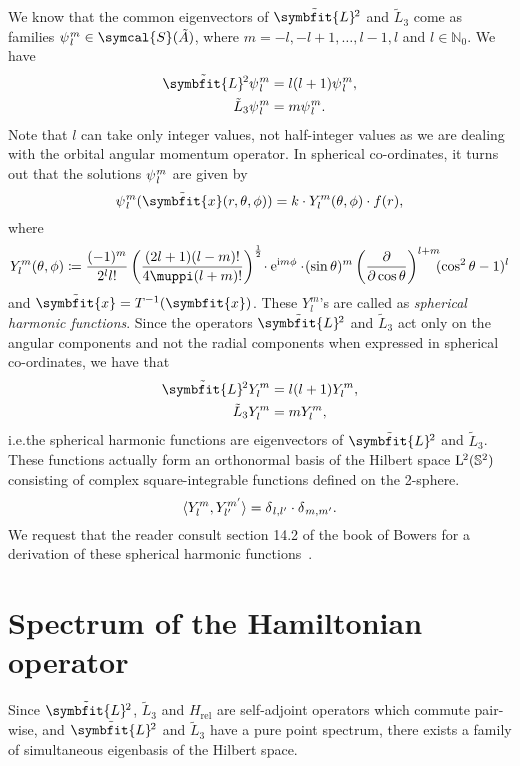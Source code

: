\documentclass[12pt, a4 paper]{article}
\theoremstyle{definition}
\newcommand{\nn}{\mathbb{N}_0}
\newcommand{\schwartz}{\symcal{S}}
\renewcommand{\i}{\mathrm{i}}
\newcommand{\e}{\mathrm{e}}
\renewcommand{\pi}{\muppi}
\newcommand{\lvecsquare}{\tilde{\symbfit{L}}\kern-1pt^2}
\begin{document}
	We know that the common eigenvectors of $\lvecsquare$ and $\tilde{L}_3$ come as families $\psi\kern0.5pt_l^m \in \schwartz(\tilde{A})$, where $m = -l, -l+1, \ldots, l-1, l$ and $l \in \nn$. We have
	\begin{align*}
	    \lvecsquare \psi\kern0.5pt_l^m &= l(l+1)\psi\kern0.5pt_l^m,\\
		\tilde{L}_3 \psi\kern0.5pt_l^m &= m \psi\kern0.5pt_l^m.
	\end{align*}
	Note that $l$ can take only integer values, not half-integer values as we are dealing with the orbital angular momentum operator. In spherical co-ordinates, it turns out that the solutions $\psi\kern0.5pt_l^m$ are given by
	\[
		\psi\kern0.5pt_l^m (\tilde{\symbfit{x}} (r, \theta, \phi)) = k \cdot Y^m_l (\theta, \phi) \cdot f(r),
	\]
	where
	\[
		Y^m_l (\theta, \phi) \coloneq \frac{(-1)^m}{2^l l!}\left(\frac{(2l+1) (l-m)!}{4\pi (l+m)!}\right)^{\frac{1}{2}}\!\cdot\e^{\i m\phi}\cdot\!(\sin{\theta})^m \left(\frac{\partial}{\partial \cos{\theta}}\right)^{l+m}\!\!\!(\cos^2{\theta} -1)^l
	\]
	and $\tilde{\symbfit{x}} = T^{-1}(\symbfit{x})$. These $Y_l^m$'s are called as \textit{spherical harmonic functions}. Since the operators $\lvecsquare$ and $\tilde{L}_3$ act only on the angular components and not the radial components when expressed in spherical co-ordinates, we have that
	\begin{align*}
	    \lvecsquare Y_l^m &= l(l+1) Y_l^m,\\
		\tilde{L}_3 Y_l^m &= m Y_l^m,
	\end{align*}
	i.e.\@ the spherical harmonic functions are eigenvectors of $\lvecsquare$ and $\tilde{L}_3$. These functions actually form an orthonormal basis of the Hilbert space $\mathrm{L}\kern-0.7pt^2(\mathbb{S}^2)$ consisting of complex square-integrable functions defined on the 2-sphere.
	\[
		\langle Y_l^m , Y_{l'}^{m'} \rangle = \delta\kern0.5pt_{l, l'}\cdot\delta\kern0.4pt_{m, m'}.
	\]
	We request that the reader consult section 14.2 of the book of Bowers for a derivation of these spherical harmonic functions~\cite[p.~200]{Bowers}.

	\section{Spectrum of the Hamiltonian operator}

	Since $\lvecsquare$, $\tilde{L}_3$ and $H_\text{rel}$ are self-adjoint operators which commute pair-wise, and $\lvecsquare$ and $\tilde{L}_3$ have a pure point spectrum, there exists a family of simultaneous eigenbasis of the Hilbert space.
\end{document}
